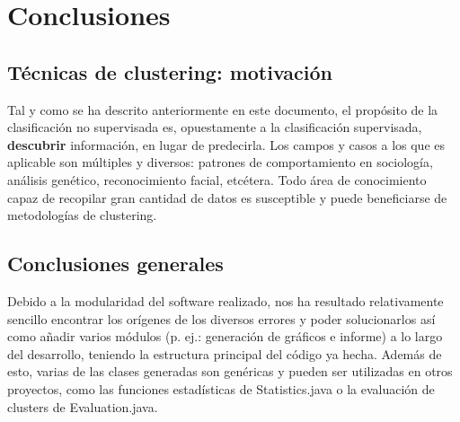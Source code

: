 \documentclass[10pt,a4paper]{article}
\begin{document}
%



\section{Conclusiones}

\subsection{Técnicas de clustering: motivación}

Tal y como se ha descrito anteriormente en este documento, el propósito de la
clasificación no supervisada es, opuestamente a la clasificación supervisada,
\textbf{descubrir} información, en lugar de predecirla. Los campos y casos a los
que es aplicable son múltiples y diversos: patrones de comportamiento en
sociología, análisis genético, reconocimiento facial, etcétera. Todo área de
conocimiento capaz de recopilar gran cantidad de datos es susceptible y puede
beneficiarse de metodologías de clustering.


\subsection{Conclusiones generales}

Debido a la modularidad del software realizado, nos ha resultado relativamente
sencillo encontrar los orígenes de los diversos errores y poder solucionarlos
así como añadir varios módulos (p. ej.:
generación de gráficos e informe) a lo largo del desarrollo, teniendo la
estructura principal del código ya hecha. Además de esto, varias de las clases
generadas son genéricas y pueden ser utilizadas en otros proyectos, como las 
funciones estadísticas de Statistics.java o la evaluación de clusters de Evaluation.java.\\
\end{document}
